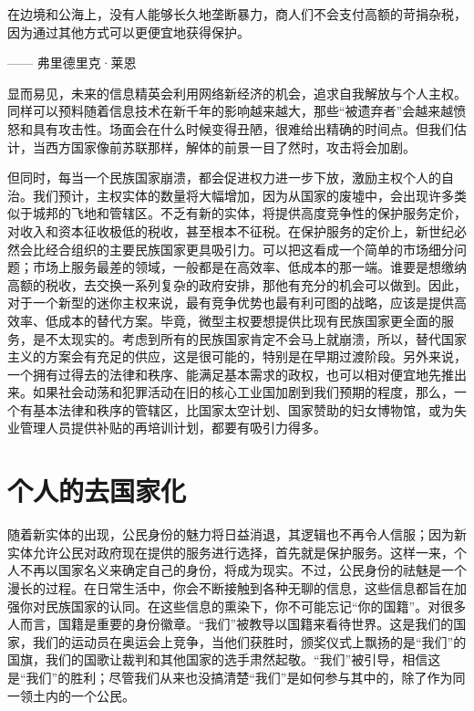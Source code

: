 \begin{tcolorbox}
\kaishu 在边境和公海上，没有人能够长久地垄断暴力，商人们不会支付高额的苛捐杂税，因为通过其他方式可以更便宜地获得保护。
\begin{flushright}
—— 弗里德里克·莱恩
\end{flushright}
\end{tcolorbox}

显而易见，未来的信息精英会利用网络新经济的机会，追求自我解放与个人主权。同样可以预料随着信息技术在新千年的影响越来越大，那些“被遗弃者”会越来越愤怒和具有攻击性。场面会在什么时候变得丑陋，很难给出精确的时间点。但我们估计，当西方国家像前苏联那样，解体的前景一目了然时，攻击将会加剧。

但同时，每当一个民族国家崩溃，都会促进权力进一步下放，激励主权个人的自治。我们预计，主权实体的数量将大幅增加，因为从国家的废墟中，会出现许多类似于城邦的飞地和管辖区。不乏有新的实体，将提供高度竞争性的保护服务定价，对收入和资本征收极低的税收，甚至根本不征税。在保护服务的定价上，新世纪必然会比经合组织的主要民族国家更具吸引力。可以把这看成一个简单的市场细分问题；市场上服务最差的领域，一般都是在高效率、低成本的那一端。谁要是想缴纳高额的税收，去交换一系列复杂的政府安排，那他有充分的机会可以做到。因此，对于一个新型的迷你主权来说，最有竞争优势也最有利可图的战略，应该是提供高效率、低成本的替代方案。毕竟，微型主权要想提供比现有民族国家更全面的服务，是不太现实的。考虑到所有的民族国家肯定不会马上就崩溃，所以，替代国家主义的方案会有充足的供应，这是很可能的，特别是在早期过渡阶段。另外来说，一个拥有过得去的法律和秩序、能满足基本需求的政权，也可以相对便宜地先推出来。如果社会动荡和犯罪活动在旧的核心工业国加剧到我们预期的程度，那么，一个有基本法律和秩序的管辖区，比国家太空计划、国家赞助的妇女博物馆，或为失业管理人员提供补贴的再培训计划，都要有吸引力得多。

\section{个人的去国家化}
随着新实体的出现，公民身份的魅力将日益消退，其逻辑也不再令人信服；因为新实体允许公民对政府现在提供的服务进行选择，首先就是保护服务。这样一来，个人不再以国家名义来确定自己的身份，将成为现实。不过，公民身份的祛魅是一个漫长的过程。在日常生活中，你会不断接触到各种无聊的信息，这些信息都旨在加强你对民族国家的认同。在这些信息的熏染下，你不可能忘记“你的国籍”。对很多人而言，国籍是重要的身份徽章。“我们”被教导以国籍来看待世界。这是我们的国家，我们的运动员在奥运会上竞争，当他们获胜时，颁奖仪式上飘扬的是“我们”的国旗，我们的国歌让裁判和其他国家的选手肃然起敬。“我们”被引导，相信这是“我们”的胜利；尽管我们从来也没搞清楚“我们”是如何参与其中的，除了作为同一领土内的一个公民。

